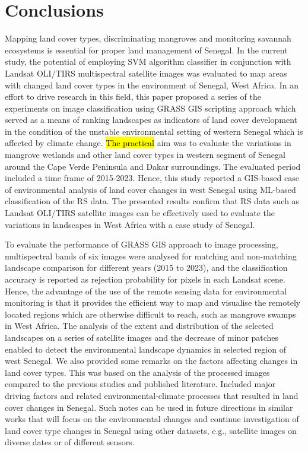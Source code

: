 \documentclass[earth,article,submit,pdftex,moreauthors]{Definitions/mdpi}
\begin{document}
\section{Conclusions}

{Mapping land cover types, discriminating mangroves and monitoring savannah ecosystems is essential for proper land management of Senegal. In the current study, the potential of employing SVM algorithm classifier in conjunction with Landsat OLI/TIRS multispectral satellite images was evaluated to map areas with changed land cover types in the environment of Senegal, West Africa. }In an effort to drive research in this field, this paper proposed a series of the experiments on image classification using GRASS GIS scripting approach which served as a means of ranking landscapes as indicators of land cover development in the condition of the unstable environmental setting of western Senegal which is affected by climate change. {\hl{The practical} aim was }to evaluate the variations in mangrove wetlands and other land cover types in western segment of Senegal around the Cape Verde Peninsula and Dakar surroundings{. The evaluated period included a time frame of} 2015-2023. {Hence}, this study reported a GIS-based case of {environmental} analysis of land cover changes in west Senegal {using ML-based classification of the RS data}. The presented results confirm that {RS} data such as Landsat OLI/TIRS {satellite }images can be effectively used to evaluate the variations in landscapes in West Africa {with a case study of Senegal}. 

{To }evaluate the performance of GRASS GIS approach to image processing, {multispectral bands of six} images were analysed for matching and non-matching landscape comparison for different years (2015 to 2023), and the classification accuracy is reported as rejection probability for pixels in each Landsat scene. Hence, the advantage of the use of the remote sensing data for environmental monitoring is that it provides the efficient way to map and visualise the remotely located regions which are otherwise difficult to reach, such as mangrove swamps in West Africa. The analysis of the extent and distribution of the selected landscapes on a series of satellite images and the decrease of minor patches enabled to detect the environmental landscape dynamics in selected region of west Senegal. We also provided {some} remarks on the {factors affecting changes in} land cover types{. This was }based on the analysis of the processed images compared to the previous studies and published literature. Included major driving factors and related environmental-climate processes that resulted in land cover changes in Senegal. Such notes can be used in future directions in similar works that will focus on the environmental changes and continue investigation of land cover type changes in Senegal using other datasets{, }e.g., satellite images on diverse dates or of different sensors{.}
\end{document}
